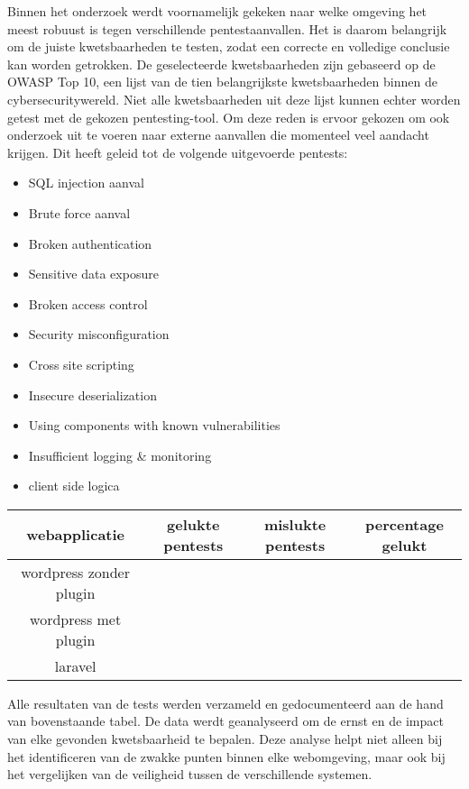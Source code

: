 Binnen het onderzoek werdt voornamelijk gekeken naar welke omgeving het meest robuust is tegen verschillende pentestaanvallen. 
Het is daarom belangrijk om de juiste kwetsbaarheden te testen, zodat een correcte en volledige conclusie kan worden 
getrokken. De geselecteerde kwetsbaarheden zijn gebaseerd op de OWASP Top 10, een lijst van de tien belangrijkste 
kwetsbaarheden binnen de cybersecuritywereld. Niet alle kwetsbaarheden uit deze lijst kunnen echter worden getest met de 
gekozen pentesting-tool. Om deze reden is ervoor gekozen om ook onderzoek uit te voeren naar externe aanvallen die momenteel veel 
aandacht krijgen. Dit heeft geleid tot de volgende uitgevoerde pentests:

\begin{itemize}
    \item SQL injection aanval
    \item Brute force aanval
    \item Broken authentication
    \item Sensitive data exposure
    \item Broken access control
    \item Security misconfiguration
    \item Cross site scripting
    \item Insecure deserialization
    \item Using components with known vulnerabilities
    \item Insufficient logging \& monitoring 
    \item client side logica
\end{itemize}

\begin{tabular}{ | c | c | c | c |}
    \hline			
    webapplicatie & gelukte pentests & mislukte pentests & percentage gelukt \\
    \hline  
    wordpress zonder plugin & & & \\
    wordpress met plugin & & & \\
    laravel &  &  & \\
    \hline
\end{tabular}

Alle resultaten van de tests werden verzameld en gedocumenteerd aan de hand van bovenstaande tabel. De data werdt geanalyseerd 
om de ernst en de impact van elke gevonden kwetsbaarheid te bepalen. Deze analyse helpt niet alleen bij 
het identificeren van de zwakke punten binnen elke webomgeving, maar ook bij het vergelijken van de 
veiligheid tussen de verschillende systemen.

